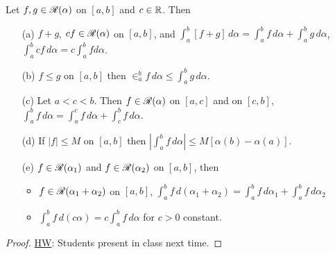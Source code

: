 \documentclass[]{article}
\begin{document}
\begin{theorem}
	Let $f,g\in\mathscr{R}(\alpha)$ on $[a,b]$ and $c\in\mathbb{R}$. Then
	\begin{enumerate}
		\item[(a)] $f+g$, $cf\in\mathscr{R}(\alpha)$ on $[a,b]$, and
			$ \int_a^b [f+g]\,d\alpha = \int_a^b f\,d\alpha + \int_a^b g\,d\alpha$, $\int_a^b cf\,d\alpha = c\int_a^b fd\alpha$.
		\item[(b)] $f\leq g$ on $[a,b]$ then $\in_a^b f\,d\alpha \leq \int_a^b g\,d\alpha$.
		\item[(c)] Let $a<c<b$. Then $f\in\mathscr{R}(\alpha)$ on $[a,c]$ and on $[c,b]$,
			$\int_a^b f\,d\alpha = \int_a^c f\,d\alpha + \int_c^b f\,d\alpha$.
		\item[(d)] If $|f|\leq M$ on $[a,b]$ then $|\int_a^b f\,d\alpha| \leq M[\alpha(b)-\alpha(a)]$.
		\item[(e)] $f\in\mathscr{R}(\alpha_1)$ and $f\in\mathscr{R}(\alpha_2)$ on $[a,b]$, then 
			\begin{itemize}
				\item $f\in\mathscr{R}(\alpha_1+\alpha_2)$ on $[a,b]$, $\int_a^b f\,d(\alpha_1+\alpha_2) = \int_a^b f\,d\alpha_1 + \int_a^b f\,d\alpha_2$
				\item $\int_a^b f\,d(c\alpha) = c\int_a^b f\,d\alpha$ for $c>0$ constant.
		\end{itemize}
	\end{enumerate}
\end{theorem}
\begin{proof}
	\ul{HW}: Students present in class next time.
\end{proof}

\newpage
\end{document}
